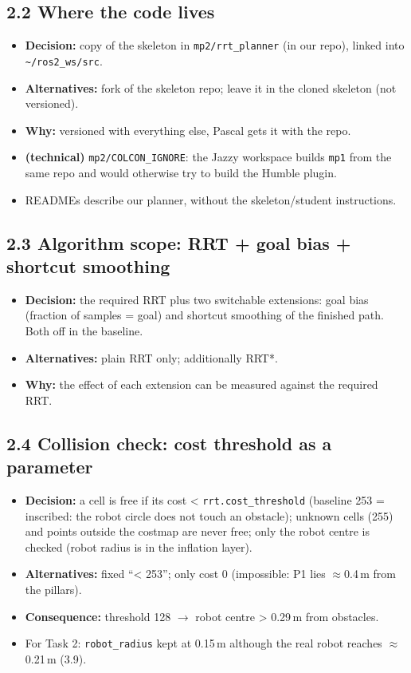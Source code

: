 \documentclass[10pt]{article}
\newcommand{\pkg}[1]{\texttt{#1}}
\begin{document}
\subsection*{2.2 Where the code lives}
\begin{itemize}
  \item \textbf{Decision:} copy of the skeleton in \pkg{mp2/rrt\_planner} (in our repo), linked into \pkg{\textasciitilde{}/ros2\_ws/src}.
  \item \textbf{Alternatives:} fork of the skeleton repo; leave it in the cloned skeleton (not versioned).
  \item \textbf{Why:} versioned with everything else, Pascal gets it with the repo.
  \item \textbf{(technical)} \pkg{mp2/COLCON\_IGNORE}: the Jazzy workspace builds \pkg{mp1} from the same repo and would otherwise try to build the Humble plugin.
  \item READMEs describe our planner, without the skeleton/student instructions.
\end{itemize}

\subsection*{2.3 Algorithm scope: RRT + goal bias + shortcut smoothing}
\begin{itemize}
  \item \textbf{Decision:} the required RRT plus two switchable extensions: goal bias (fraction of samples = goal) and shortcut smoothing of the finished path. Both off in the baseline.
  \item \textbf{Alternatives:} plain RRT only; additionally RRT*.
  \item \textbf{Why:} the effect of each extension can be measured against the required RRT.
\end{itemize}

\subsection*{2.4 Collision check: cost threshold as a parameter}
\begin{itemize}
  \item \textbf{Decision:} a cell is free if its cost < \pkg{rrt.cost\_threshold} (baseline 253 = inscribed: the robot circle does not touch an obstacle); unknown cells (255) and points outside the costmap are never free; only the robot centre is checked (robot radius is in the inflation layer).
  \item \textbf{Alternatives:} fixed ``< 253''; only cost 0 (impossible: P1 lies $\approx$0.4\,m from the pillars).
  \item \textbf{Consequence:} threshold 128 $\rightarrow$ robot centre > 0.29\,m from obstacles.
  \item For Task 2: \pkg{robot\_radius} kept at 0.15\,m although the real robot reaches $\approx$0.21\,m (3.9).
\end{itemize}
\end{document}
